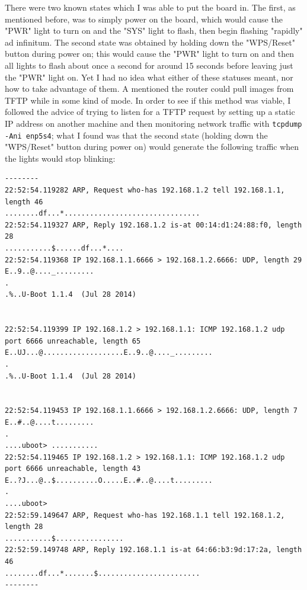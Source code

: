 \documentclass{article}
\begin{document}
There were two known states which I was able to put the board in.  The first, as mentioned before, was to simply power on the board, which would cause the "PWR" light to turn on and the "SYS" light to flash, then begin flashing "rapidly" ad infinitum.  The second state was obtained by holding down the "WPS/Reset" button during power on; this would cause the "PWR" light to turn on and then all lights to flash about once a second for around 15 seconds before leaving just the "PWR" light on.  Yet I had no idea what either of these statuses meant, nor how to take advantage of them.  A    mentioned the router could pull images from TFTP while in some kind of  mode.  In order to see if this method was viable, I followed the advice of trying to listen for a TFTP request by setting up a static IP address on another machine and then monitoring network traffic with \texttt{tcpdump -Ani enp5s4}; what I found was that the second state (holding down the "WPS/Reset" button during power on) would generate the following traffic when the lights would stop blinking:

\begin{verbatim}
--------
22:52:54.119282 ARP, Request who-has 192.168.1.2 tell 192.168.1.1, length 46
........df...*................................
22:52:54.119327 ARP, Reply 192.168.1.2 is-at 00:14:d1:24:88:f0, length 28
...........$......df...*....
22:52:54.119368 IP 192.168.1.1.6666 > 192.168.1.2.6666: UDP, length 29
E..9..@...._.........
.
.%..U-Boot 1.1.4  (Jul 28 2014)


22:52:54.119399 IP 192.168.1.2 > 192.168.1.1: ICMP 192.168.1.2 udp port 6666 unreachable, length 65
E..UJ...@...................E..9..@...._.........
.
.%..U-Boot 1.1.4  (Jul 28 2014)


22:52:54.119453 IP 192.168.1.1.6666 > 192.168.1.2.6666: UDP, length 7
E..#..@....t.........
.
....uboot> ...........
22:52:54.119465 IP 192.168.1.2 > 192.168.1.1: ICMP 192.168.1.2 udp port 6666 unreachable, length 43
E..?J...@..$..........O.....E..#..@....t.........
.
....uboot>
22:52:59.149647 ARP, Request who-has 192.168.1.1 tell 192.168.1.2, length 28
...........$................
22:52:59.149748 ARP, Reply 192.168.1.1 is-at 64:66:b3:9d:17:2a, length 46
........df...*.......$........................
--------
\end{verbatim}
\end{document}
